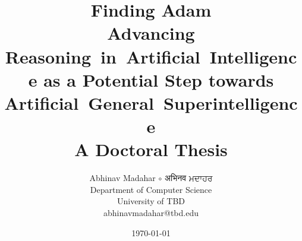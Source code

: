 \title{
    {\huge \textbf{Finding Adam}} \\
    Advancing Reasoning~in~Artificial~Intelligence as a Potential Step towards Artificial~General~Superintelligence
    \vspace{1cm} \\
    A Doctoral Thesis}

\author{
    Abhinav Madahar $\circ$ {\devanagari अभिनव } {\gurmukhi ਮਦਾਹਰ} \\
    Department of Computer Science \\
    University of TBD \\
    {\small abhinavmadahar@tbd.edu}}

\date{\today}

\maketitle{}
